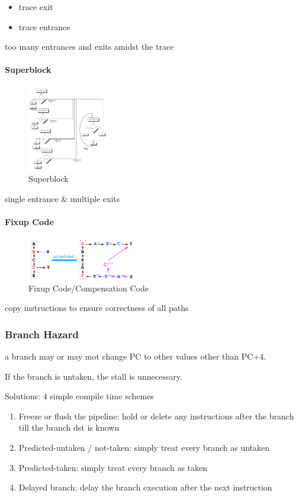 \begin{itemize}
    \item trace exit
    \item trace entrance
\end{itemize}
too many entrances and exits amidst the trace

\paragraph{Superblock}
\begin{figure}[!htb]
    \centering
    \includegraphics[width=0.309\textwidth]{pic/CA3/Superblock}
    \caption{Superblock}
\end{figure}
single entrance \& multiple exits

\paragraph{Fixup Code}
\begin{figure}[!htb]
    \centering
    \includegraphics[width=0.42\textwidth]{pic/CA3/Fixup Code}
    \caption{Fixup Code/Compensation Code}
\end{figure}
copy instructions to ensure correctness of all paths

\subsubsection{Branch Hazard}
a branch may or may mot change PC to other values other than PC+4.

If the branch is untaken, the stall is unnecessary. 

Solutions: 4 simple compile time schemes
\begin{enumerate}
    \item Freeze or flush the pipeline: hold or delete any instructions after the
    branch till the branch dst is known
    \item Predicted-untaken / not-taken: simply treat every branch as untaken
    \item Predicted-taken: simply treat every branch as taken
    \item Delayed branch: delay the branch execution after the
    next instruction
\end{enumerate}

